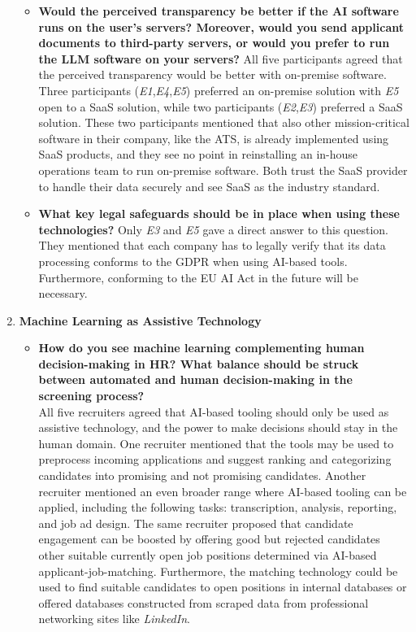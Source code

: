 \documentclass[draft,final]{thesisclass} %
\begin{document}
\begin{enumerate}
\begin{itemize}
        \item \textbf{Would the perceived transparency be better if the \acs{AI} software runs on the user's servers? Moreover, would you send applicant documents to third-party servers, or would you prefer to run the \gls{LLM} software on your servers?}
        All five participants agreed that the perceived transparency would be better with on-premise software.
        Three participants (\textit{E1},\textit{E4},\textit{E5}) preferred an on-premise solution with \textit{E5} open to a \acs{SaaS} solution, while two participants (\textit{E2},\textit{E3}) preferred a \acs{SaaS} solution.
        These two participants mentioned that also other mission-critical software in their company, like the \acs{ATS}, is already implemented using \acs{SaaS} products, and they see no point in reinstalling an in-house operations team to run on-premise software.
        Both trust the \acs{SaaS} provider to handle their data securely and see \acs{SaaS} as the industry standard.
        \item \textbf{What key legal safeguards should be in place when using these technologies?}
        Only \textit{E3} and \textit{E5} gave a direct answer to this question. They mentioned that each company has to legally verify that its data processing conforms to the \acs{GDPR} when using \acs{AI}-based tools. Furthermore, conforming to the \acs{EU AI Act} in the future will be necessary.
    \end{itemize}
    \item \textbf{Machine Learning as Assistive Technology}
    \begin{itemize}
        \item \textbf{How do you see machine learning complementing human decision-making in \acs{HR}? What balance should be struck between automated and human decision-making in the screening process?}\\
        All five recruiters agreed that \acs{AI}-based tooling should only be used as assistive technology, and the power to make decisions should stay in the human domain. One recruiter mentioned that the tools may be used to preprocess incoming applications and suggest ranking and categorizing candidates into promising and not promising candidates. Another recruiter mentioned an even broader range where \acs{AI}-based tooling can be applied, including the following tasks: transcription, analysis, reporting, and job ad design. The same recruiter proposed that candidate engagement can be boosted by offering good but rejected candidates other suitable currently open job positions determined via \acs{AI}-based applicant-job-matching. Furthermore, the matching technology could be used to find suitable candidates to open positions in internal databases or offered databases constructed from scraped data from professional networking sites like \textit{LinkedIn}.

\end{itemize}
\end{enumerate}
\end{document}
